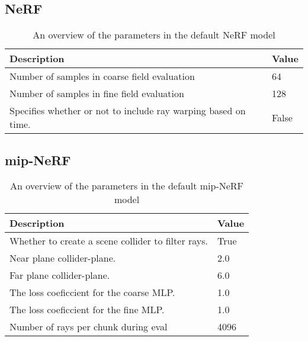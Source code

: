 \subsection{NeRF}
\begin{table}[h]
    \begin{tabular}{|l|l|}
    \hline
    \textbf{Description} & \textbf{Value} \\ 
    \hline
    Number of samples in coarse field evaluation & 64 \\
    Number of samples in fine field evaluation & 128 \\
    Specifies whether or not to include ray warping based on time. & False \\
    \hline
    \end{tabular}
    \caption{An overview of the parameters in the default NeRF model}
    \label{tab:nerf-parameter-overview}
\end{table}

\subsection{mip-NeRF}
\begin{table}[h]
    \begin{tabular}{|l|l|}
    \hline
    \textbf{Description} & \textbf{Value} \\ 
    \hline
    Whether to create a scene collider to filter rays.  & True \\
    Near plane collider-plane.                          & 2.0 \\
    Far plane collider-plane.                           & 6.0 \\
    The loss coeficcient for the coarse MLP.            & 1.0 \\
    The loss coeficcient for the fine MLP.              & 1.0 \\
    Number of rays per chunk during eval                & 4096 \\
    \hline
    \end{tabular}
    \caption{An overview of the parameters in the default mip-NeRF model}
    \label{tab:mip-nerf-parameter-overview}
\end{table}


